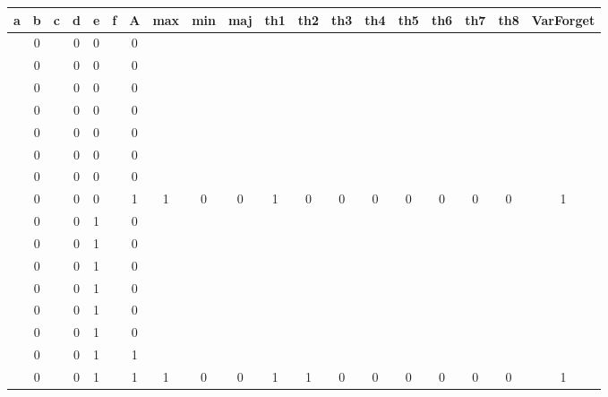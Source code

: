 \begin{table}[!tb]
    \centering
    \begin{tabular}{|c|c|c|c|c|c|c|c|c|c|c|c|c|c|c|c|c|c|c|}
        \hline
        \textbf{a} & \textbf{b} & \textbf{c} & \textbf{d} & \textbf{e} & \textbf{f} & \textbf{A} & \textbf{max} & \textbf{min} & \textbf{maj} & \textbf{th1} & \textbf{th2} & \textbf{th3} & \textbf{th4} & \textbf{th5} & \textbf{th6} & \textbf{th7} & \textbf{th8} & \textbf{VarForget} \\ \hline
        \rowcolor{gray!40}  & 0 &  & 0 & 0 &  & 0 &  &  &  &  &  &  &  &  &  &  &  &  \\ \hline
        \rowcolor{gray!40}  & 0 &  & 0 & 0 &  & 0 &  &  &  &  &  &  &  &  &  &  &  &  \\ \hline
        \rowcolor{gray!40}  & 0 &  & 0 & 0 &  & 0 &  &  &  &  &  &  &  &  &  &  &  &  \\ \hline
        \rowcolor{gray!40}  & 0 &  & 0 & 0 &  & 0 &  &  &  &  &  &  &  &  &  &  &  &  \\ \hline
        \rowcolor{gray!40}  & 0 &  & 0 & 0 &  & 0 &  &  &  &  &  &  &  &  &  &  &  &  \\ \hline
        \rowcolor{gray!40}  & 0 &  & 0 & 0 &  & 0 &  &  &  &  &  &  &  &  &  &  &  &  \\ \hline
        \rowcolor{gray!40}  & 0 &  & 0 & 0 &  & 0 &  &  &  &  &  &  &  &  &  &  &  &  \\ \hline
        \rowcolor{gray!40}  & 0 &  & 0 & 0 &  & 1 & 1 & 0 & 0 & 1 & 0 & 0 & 0 & 0 & 0 & 0 & 0 & 1 \\ \hline
        \rowcolor{blue!40}  & 0 &  & 0 & 1 &  & 0 &  &  &  &  &  &  &  &  &  &  &  &  \\ \hline
        \rowcolor{blue!40}  & 0 &  & 0 & 1 &  & 0 &  &  &  &  &  &  &  &  &  &  &  &  \\ \hline
        \rowcolor{blue!40}  & 0 &  & 0 & 1 &  & 0 &  &  &  &  &  &  &  &  &  &  &  &  \\ \hline
        \rowcolor{blue!40}  & 0 &  & 0 & 1 &  & 0 &  &  &  &  &  &  &  &  &  &  &  &  \\ \hline
        \rowcolor{blue!40}  & 0 &  & 0 & 1 &  & 0 &  &  &  &  &  &  &  &  &  &  &  &  \\ \hline
        \rowcolor{blue!40}  & 0 &  & 0 & 1 &  & 0 &  &  &  &  &  &  &  &  &  &  &  &  \\ \hline
        \rowcolor{blue!40}  & 0 &  & 0 & 1 &  & 1 &  &  &  &  &  &  &  &  &  &  &  &  \\ \hline
        \rowcolor{blue!40}  & 0 &  & 0 & 1 &  & 1 & 1 & 0 & 0 & 1 & 1 & 0 & 0 & 0 & 0 & 0 & 0 & 1 \\ \hline

\end{tabular}
\end{table}
